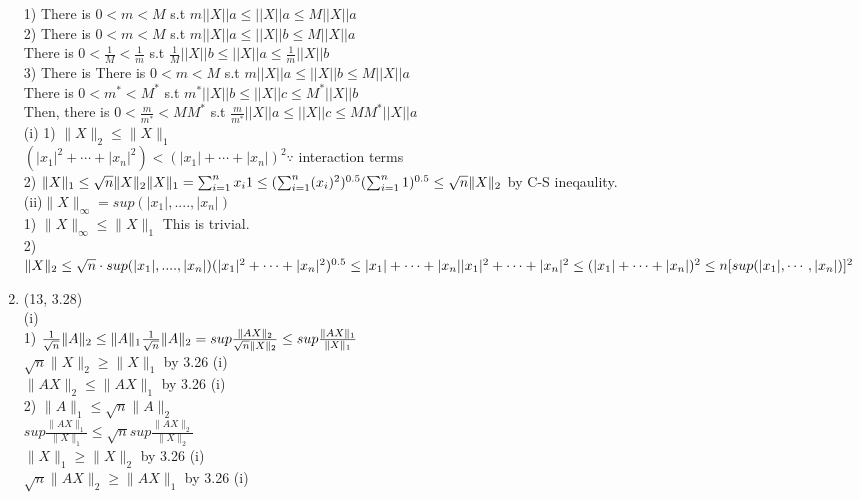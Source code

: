 \documentclass[letterpaper,12pt]{article}
\theoremstyle{definition}
\begin{document}
\begin{enumerate}
			1) There is $0<m<M$ s.t $m||X||a \leq ||X||a \leq M||X||a$ \\
			2) There is $0<m<M$ s.t $m||X||a \leq ||X||b \leq M||X||a$ \\
			There is $0<\frac{1}{M}<\frac{1}{m}$ s.t $\frac{1}{M}||X||b \leq ||X||a \leq \frac{1}{m}||X||b$ \\
			3) There is There is $0<m<M$ s.t $m||X||a \leq ||X||b \leq M||X||a$ \\
			There is $0<m^*<M^*$ s.t $m^*||X||b \leq ||X||c \leq M^*||X||b$ \\
			Then, there is $0<\frac{m}{m^*}<MM^* $ s.t $\frac{m}{m^*}||X||a \leq ||X||c \leq MM^*||X||a$ \\

	(i) 1) $\| X \|_{2} \leq  \|X \|_{1}$ \\
		$ (|x_{1}|^2 +\cdots +|x_{n}|^2)< (|x_{1}| + \cdots + |x_{n}|)^2  \because $   interaction terms\\
	     2) $\| X \|_{1} \leq \sqrt{n}\| X \|_{2} \\
		\| X \|_{1} = \sum_{i=1}^{n}x_{i}1 \leq (\sum_{i=1}^{n}(x_{i})^2)^{0.5}(\sum_{i=1}^{n}1)^{0.5} \leq \sqrt{n}\| X\|_{2}$ by C-S ineqaulity. \\

	(ii)$ \| X\|_{\infty} = sup(|x_{1}|, .... , |x_{n}|) $ \\
		1) $\| X\|_{\infty} \leq \| X\|_{1}$ This is trivial. \\
		 2) $\| X\|_{2} \leq \sqrt{n} \cdot sup(|x_{1}|, .... , |x_{n}|) \\
		(|x_{1}|^2 + \cdots +|x_{n}|^2)^{0.5} \leq |x_{1}| +\cdots+ |x_{n}| \\
		|x_{1}|^2 +\cdots + |x_{n}|^2 \leq (|x_{1}| + \cdots + |x_{n}|)^2 \leq n[sup(|x_{1}|, \cdots, |x_{n}|)]^2$



	\item (13, 3.28) \\(i)\\
	 1) $\frac{1}{\sqrt{n}} \| A \|_{2} \leq \| A \|_{1} \\
		\frac{1}{\sqrt{n}} \| A \|_{2} = sup \frac{\| AX \|_{2}}{\sqrt{n}\| X \|_{2} } \leq sup \frac{\| AX \|_{1}}{\| X \|_{1}} $ \\
	$\sqrt{n}\| X \|_{2} \geq \| X \|_{1} $ by 3.26 (i) \\
	$\| AX \|_{2} \leq \| AX \|_{1} $ by 3.26 (i) \\ 

	2)  $\| A \|_{1} \leq \sqrt{n} \| A \|_{2}$ \\
		$sup \frac{\| AX \|_{1}}{\| X \|_{1}} \leq \sqrt{n} sup \frac{\| AX \|_{2}}{\| X \|_{2}} $ \\
	$\| X \|_{1} \geq \| X \|_{2} $ by 3.26 (i) \\
	$\sqrt{n}\| AX \|_{2} \geq \| AX \|_{1} $ by 3.26 (i) \\ \\


\end{enumerate}
\end{document}
